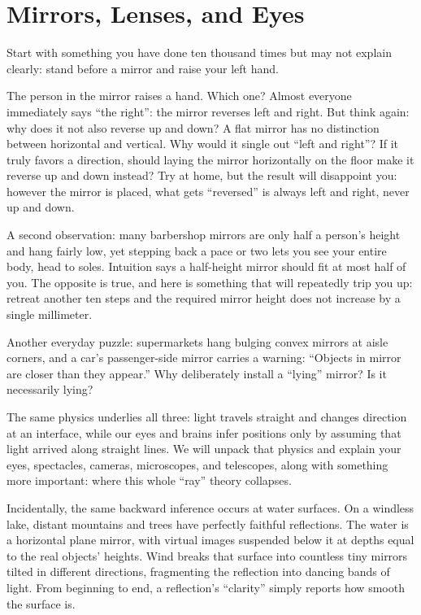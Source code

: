\chapter{Mirrors, Lenses, and Eyes}

\begin{mainline}


Start with something you have done ten thousand times but may not explain clearly: stand before a mirror and raise your left hand.

The person in the mirror raises a hand. Which one? Almost everyone immediately says ``the right'': the mirror reverses left and right. But think again: why does it not also reverse up and down? A flat mirror has no distinction between horizontal and vertical. Why would it single out ``left and right''? If it truly favors a direction, should laying the mirror horizontally on the floor make it reverse up and down instead? Try at home, but the result will disappoint you: however the mirror is placed, what gets ``reversed'' is always left and right, never up and down.

A second observation: many barbershop mirrors are only half a person's height and hang fairly low, yet stepping back a pace or two lets you see your entire body, head to soles. Intuition says a half-height mirror should fit at most half of you. The opposite is true, and here is something that will repeatedly trip you up: retreat another ten steps and the required mirror height does not increase by a single millimeter.

Another everyday puzzle: supermarkets hang bulging convex mirrors at aisle corners, and a car's passenger-side mirror carries a warning: ``Objects in mirror are closer than they appear.'' Why deliberately install a ``lying'' mirror? Is it necessarily lying?

The same physics underlies all three: light travels straight and changes direction at an interface, while our eyes and brains infer positions only by assuming that light arrived along straight lines. We will unpack that physics and explain your eyes, spectacles, cameras, microscopes, and telescopes, along with something more important: where this whole ``ray'' theory collapses.

Incidentally, the same backward inference occurs at water surfaces. On a windless lake, distant mountains and trees have perfectly faithful reflections. The water is a horizontal plane mirror, with virtual images suspended below it at depths equal to the real objects' heights. Wind breaks that surface into countless tiny mirrors tilted in different directions, fragmenting the reflection into dancing bands of light. From beginning to end, a reflection's ``clarity'' simply reports how smooth the surface is.


\end{mainline}
